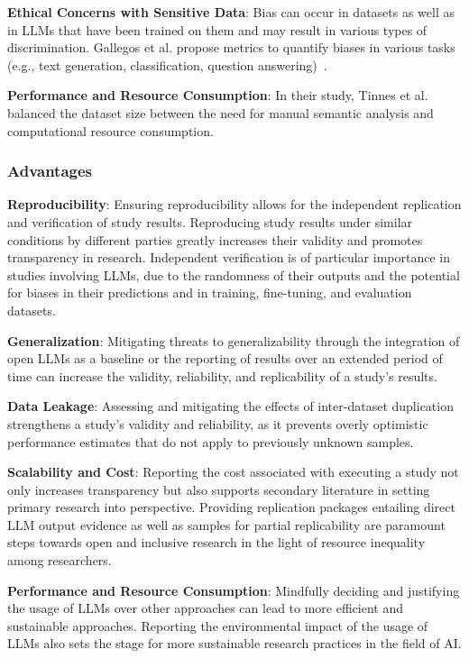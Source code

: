 \textbf{Ethical Concerns with Sensitive Data}:
Bias can occur in datasets as well as in LLMs that have been trained on them and may result in various types of discrimination. Gallegos et al. propose metrics to quantify biases in various tasks (e.g., text generation, classification, question answering)~\cite{DBLP:journals/corr/abs-2309-00770}.

\textbf{Performance and Resource Consumption}:
In their study, Tinnes et al.~\cite{tinnessoftware} balanced the dataset size between the need for manual semantic analysis and computational resource consumption.

\subsubsection{Advantages}


\textbf{Reproducibility}:
Ensuring reproducibility allows for the independent replication and verification of study results.
Reproducing study results under similar conditions by different parties greatly increases their validity and promotes transparency in research.
Independent verification is of particular importance in studies involving LLMs, due to the randomness of their outputs and the potential for biases in their predictions and in training, fine-tuning, and evaluation datasets.

\textbf{Generalization}:
Mitigating threats to generalizability through the integration of open LLMs as a baseline or the reporting of results over an extended period of time can increase the validity, reliability, and replicability of a study's results.

\textbf{Data Leakage}:
Assessing and mitigating the effects of inter-dataset duplication strengthens a study's validity and reliability, as it prevents overly optimistic performance estimates that do not apply to previously unknown samples.

\textbf{Scalability and Cost}:
Reporting the cost associated with executing a study not only increases transparency but also supports secondary literature in setting primary research into perspective.
Providing replication packages entailing direct LLM output evidence as well as samples for partial replicability are paramount steps towards open and inclusive research in the light of resource inequality among researchers.

\textbf{Performance and Resource Consumption}:
Mindfully deciding and justifying the usage of LLMs over other approaches can lead to more efficient and sustainable approaches. 
Reporting the environmental impact of the usage of LLMs also sets the stage for more sustainable research practices in the field of AI.

